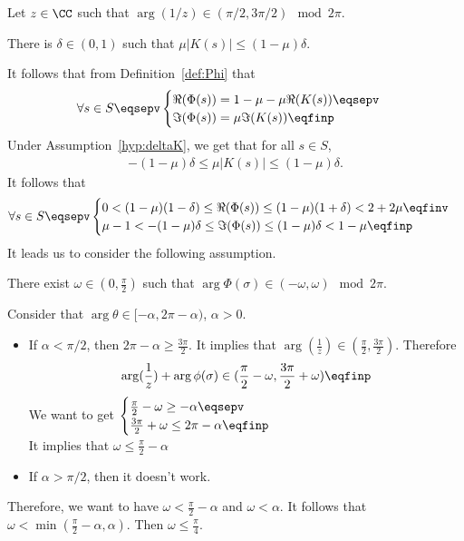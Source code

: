 Let $z \in \CC$ such that $\arg(1/z) \in (\pi/2, 3\pi/2) \mod 2\pi$.
\begin{hypothesis}
    There is $\delta \in (0,1)$ such that $ \mu |K(s)| \leq (1-\mu)\delta$.
    \label{hyp:deltaK}
\end{hypothesis}
It follows that from Definition~\eqref{def:Phi} that 
$$\forall s \in S \eqsepv 
\begin{cases}
    \Re(\Phi(s)) = 1-\mu-\mu \Re(K(s))\eqsepv \\
    \Im(\Phi(s)) = \mu \Im(K(s))\eqfinp
\end{cases}
$$
Under Assumption~\ref{hyp:deltaK}, we get that for all $s \in S$, 
    \begin{align*}
     -(1-\mu)\delta \leq \mu |K(s)| \leq (1-\mu)\delta.
    \end{align*}
It follows that
$$\forall s \in S \eqsepv 
\begin{cases}
    0 < (1-\mu)(1-\delta) \leq \Re(\Phi(s)) \leq (1-\mu)(1+\delta) < 2 + 2\mu \eqfinv
    \\ 
   \mu-1 < -(1-\mu) \delta \leq \Im(\Phi(s)) \leq (1-\mu) \delta < 1-\mu \eqfinp
\end{cases}
$$
It leads us to consider the following assumption.
\begin{hypothesis}
There exist $\omega \in \left(0, \frac\pi2 \right)$ such that $\arg\Phi(\sigma) \in (-\omega, \omega) \mod 2\pi$.   
\end{hypothesis}

Consider that $\arg \theta \in [-\alpha, 2\pi-\alpha)$, $\alpha > 0$.
\begin{itemize}
    \item If $\alpha < \pi / 2$, then 
    $2\pi - \alpha \geq \frac{3\pi}{2}$. It implies that $\arg(\frac1z) \in (\frac\pi2, \frac{3\pi}{2})$. Therefore
    $$ \arg(\frac1z) + \arg \phi(\sigma) \in (\frac\pi2 - \omega, \frac{3\pi}{2}+\omega)\eqfinp$$
    We want to get 
    $\begin{cases}
        \frac{\pi}{2}-\omega \geq - \alpha \eqsepv
        \\
        \frac{3\pi}{2}+\omega \leq 2\pi-\alpha \eqfinp
    \end{cases}$ \\
    It implies that $\omega \leq \frac{\pi}{2}-\alpha$
    \item If $\alpha > \pi / 2$, then it doesn't work. 
\end{itemize}
Therefore, we want to have $ \omega < \frac{\pi}{2}-\alpha$ and $\omega < \alpha$.
It follows that $\omega < \min(\frac\pi2 - \alpha, \alpha)$. Then $\omega \leq \frac\pi4$.  

